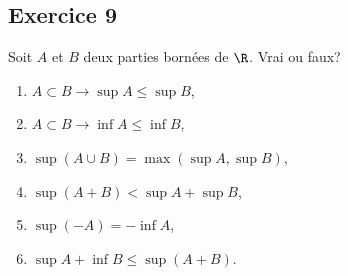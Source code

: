 \documentclass[letterpaper,10pt,french]{jupyterBook}
\begin{document}
\subsection{Exercice 9}
\label{\detokenize{exo1:exercice-9}}
\sphinxAtStartPar
Soit \(A\) et \(B\) deux parties bornées de \(\R\). Vrai ou faux?
\begin{enumerate}
%
\item {} 
\sphinxAtStartPar
\(A \subset B \rightarrow \sup A \leq \sup B\),

\item {} 
\sphinxAtStartPar
\(A \subset B \rightarrow \inf A \leq \inf B\),

\item {} 
\sphinxAtStartPar
\(\sup(A\cup B) = \max(\sup A,\sup B)\),

\item {} 
\sphinxAtStartPar
\(\sup(A+B) < \sup A+\sup B\),

\item {} 
\sphinxAtStartPar
\(\sup(−A) = −\inf A\),

\item {} 
\sphinxAtStartPar
\(\sup A+\inf B \leq \sup(A+B)\).

\end{enumerate}







\renewcommand{\indexname}{Index}
\printindex
\end{document}

